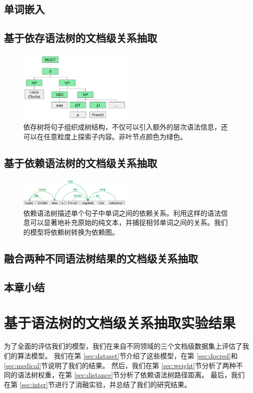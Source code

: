 \documentclass[bachelor]{thesis-uestc}
\begin{document}
    
\section{单词嵌入}

\section{基于依存语法树的文档级关系抽取}
\begin{figure}[t]
    \includegraphics[width=0.5\textwidth]{misc/constituency.png}
    \caption{依存树将句子组织成树结构，不仅可以引入额外的层次语法信息，还可以在任意粒度上探索子内容。非叶节点颜色为绿色。} 
\end{figure}\label{fig_syn_b}

\section{基于依赖语法树的文档级关系抽取}
\begin{figure}[t]
    \includegraphics[width=0.5\textwidth]{misc/dependency.png}
    \caption{依赖语法树描述单个句子中单词之间的依赖关系。利用这样的语法信息可以显著地补充原始的纯文本，并捕捉相邻单词之间的关系。我们的模型将依赖树转换为依赖图。} 
\end{figure}\label{fig_syn_a}

\section{融合两种不同语法树结果的文档级关系抽取}

\section{本章小结}
\newpage


\chapter{基于语法树的文档级关系抽取实验结果}
为了全面的评估我们的模型，我们在来自不同领域的三个文档级数据集上评估了我们的算法模型。
我们在第 \ref{sec:dataset}节介绍了这些模型，在第 \ref{sec:docred}和 \ref{sec:medical}节说明了我们的结果。
然后，我们在第 \ref{sec:weight}节分析了两种不同的语法树权重，在第 \ref{sec:distance}节分析了依赖语法树路径距离。
最后，我们在第 \ref{sec:inter}节进行了消融实验，并总结了我们的研究结果。
\end{document}
